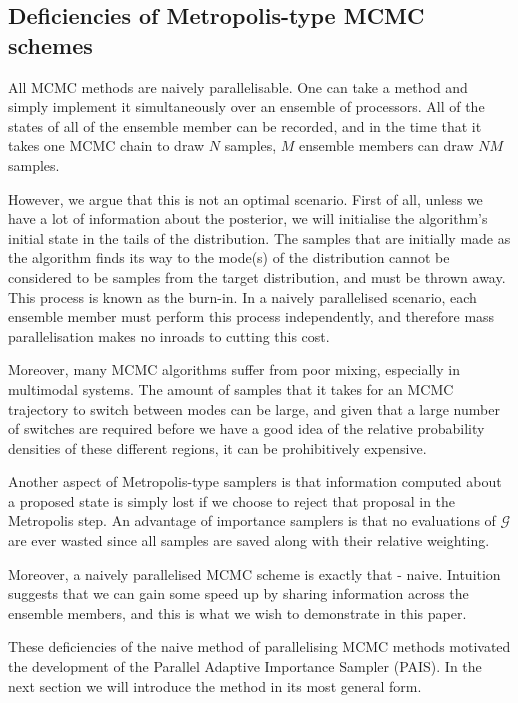 \documentclass[final]{siamltex}
\begin{document}

\subsection{Deficiencies of Metropolis-type MCMC schemes}
All MCMC methods are naively parallelisable. One can take a method
and simply implement it simultaneously over an ensemble of processors. All
of the states of all of the ensemble member can be recorded, and in the time
that it takes one MCMC chain to draw $N$ samples, $M$ ensemble members
can draw $NM$ samples. 

However, we argue that this is not an optimal
scenario. First of all, unless we have a lot of information about the
posterior, we will initialise the algorithm's initial state in the
tails of the distribution. The samples that are initially made as the
algorithm finds its way to the mode(s) of the distribution cannot be
considered to be samples from the target distribution, and must be thrown
away. This process is known as the burn-in. In a naively parallelised
scenario, each ensemble member must perform this process independently,
and therefore mass parallelisation makes no inroads to cutting this cost.

Moreover, many MCMC algorithms suffer from poor mixing, especially in
multimodal systems. The amount of samples that it takes for an MCMC
trajectory to switch between modes can be large, and given that a large
number of switches are required before we have a good idea of the relative
probability densities of these different regions, it can be prohibitively
expensive.

Another aspect of Metropolis-type samplers is that information
computed about a proposed state is simply lost if we choose to reject
that proposal in the Metropolis step. An advantage of importance
samplers is that no evaluations of $\mathcal{G}$ are ever wasted
since all samples are saved along with their relative weighting.

Moreover, a naively parallelised MCMC scheme is exactly that -
naive. Intuition suggests that we can gain some speed up by sharing
information across the ensemble members, and this is
what we wish to demonstrate in this paper.

These deficiencies of the naive method of parallelising MCMC methods
motivated the development of the Parallel Adaptive Importance Sampler
(PAIS). In the next section we will introduce the method in its most
general form.

\end{document}
